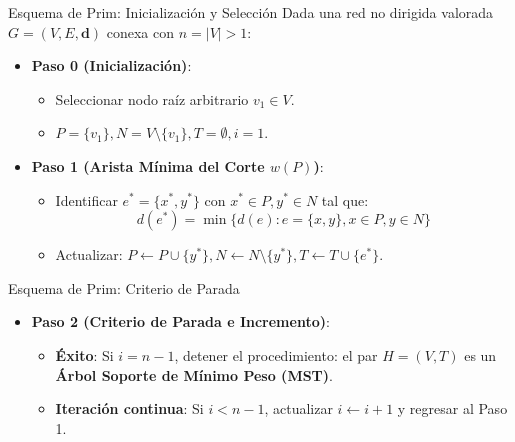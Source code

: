 \documentclass[
  ignorenonframetext,
]{beamer}
\providecommand{\tightlist}{%
  \setlength{\itemsep}{0pt}\setlength{\parskip}{0pt}}
\begin{document}
\begin{frame}{Esquema de Prim: Inicialización y Selección}
\label{esquema-de-prim-inicializaciuxf3n-y-selecciuxf3n}
Dada una red no dirigida valorada \(G = (V, E, \mathbf{d})\) conexa con
\(n = |V| > 1\):

\begin{itemize}
\tightlist
\item
  \textbf{Paso 0 (Inicialización)}:

  \begin{itemize}
  \tightlist
  \item
    Seleccionar nodo raíz arbitrario \(v_1 \in V\).
  \item
    \(P = \{v_1\}, N = V \setminus \{v_1\}, T = \emptyset, i = 1\).
  \end{itemize}
\item
  \textbf{Paso 1 (Arista Mínima del Corte \(w(P)\))}:

  \begin{itemize}
  \tightlist
  \item
    Identificar \(e^* = \{x^*, y^*\}\) con \(x^* \in P, y^* \in N\) tal
    que: \[
    d(e^*) = \min \{d(e) : e = \{x, y\}, x \in P, y \in N\}
    \]
  \item
    Actualizar:
    \(P \leftarrow P \cup \{y^*\}, N \leftarrow N \setminus \{y^*\}, T \leftarrow T \cup \{e^*\}\).
  \end{itemize}
\end{itemize}
\end{frame}

\begin{frame}{Esquema de Prim: Criterio de Parada}
\label{esquema-de-prim-criterio-de-parada}
\begin{itemize}
\tightlist
\item
  \textbf{Paso 2 (Criterio de Parada e Incremento)}:

  \begin{itemize}
  \tightlist
  \item
    \textbf{Éxito}: Si \(i = n - 1\), detener el procedimiento: el par
    \(H = (V, T)\) es un \textbf{Árbol Soporte de Mínimo Peso (MST)}.
  \item
    \textbf{Iteración continua}: Si \(i < n - 1\), actualizar
    \(i \leftarrow i + 1\) y regresar al Paso 1.
  \end{itemize}
\end{itemize}
\end{frame}
\end{document}
